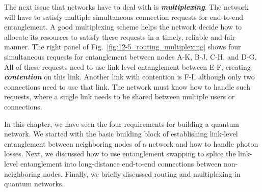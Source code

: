 The next issue that networks have to deal with is \emph{\textbf{multiplexing}}.
The network will have to satisfy multiple simultaneous connection requests for end-to-end entanglement.
A good multiplexing scheme helps the network decide how to allocate its resources to satisfy these requests in a timely, reliable and fair manner.
The right panel of Fig.~\ref{fig:12-5_routing_multiplexing} shows four simultaneous requests for entanglement between nodes A-K, B-J, C-H, and D-G.
All of these requests need to use link-level entanglement between E-F, creating \textbf{\emph{contention}} on this link.
Another link with contention is F-I, although only two connections need to use that link.
The network must know how to handle such requests, where a single link needs to be shared between multiple users or connections.

In this chapter, we have seen the four requirements for building a quantum network.
We started with the basic building block of establishing link-level entanglement between neighboring nodes of a network and how to handle photon losses.
Next, we discussed how to use entanglement swapping to splice the link-level entanglement into long-distance end-to-end connections between non-neighboring nodes.
Finally, we briefly discussed routing and multiplexing in quantum networks.





